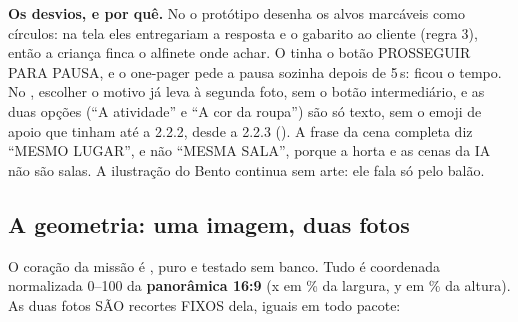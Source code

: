 \textbf{Os desvios, e por quê.} No  o protótipo desenha os
alvos marcáveis como círculos: na tela eles entregariam a resposta e o
gabarito ao cliente (regra 3), então a criança finca o alfinete onde achar. O
 tinha o botão PROSSEGUIR PARA PAUSA, e o one-pager pede a pausa
sozinha depois de 5\,s: ficou o tempo. No , escolher o motivo já
leva à segunda foto, sem o botão intermediário, e as duas opções (\enquote{A
atividade} e \enquote{A cor da roupa}) são só texto, sem o emoji de apoio que
tinham até a 2.2.2, desde a 2.2.3 (). A frase da cena completa diz
\enquote{MESMO LUGAR}, e não \enquote{MESMA SALA}, porque a horta e as cenas da
IA não são salas. A ilustração do Bento continua sem arte: ele fala só pelo
balão.

\subsection{A geometria: uma imagem, duas fotos}

O coração da missão é , puro e testado sem banco.
Tudo é coordenada normalizada 0--100 da \textbf{panorâmica 16:9} (x em \% da
largura, y em \% da altura). As duas fotos SÃO recortes FIXOS dela, iguais em
todo pacote:

